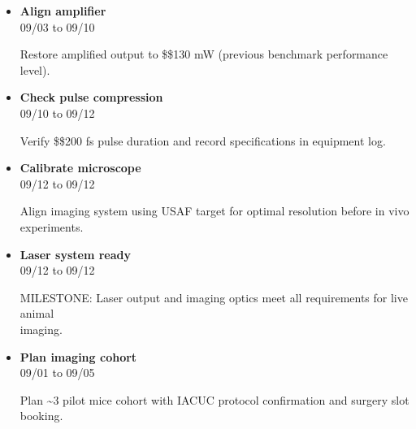 \documentclass[landscape,a4paper]{article}
\begin{document}
\begin{itemize}[leftmargin=1cm, itemsep=0.8em]
    \item \textcolor{researchexp}{\textbf{Align amplifier}}\\[0.2em]
          \textcolor{black!70}{\small 09/03 to 09/10}
\\[0.3em]
          \begin{minipage}[t]{0.85\textwidth}
          \textcolor{black!80}{Restore amplified output to \$\geq\$130 mW (previous benchmark performance level).}
          \end{minipage}

    \item \textcolor{researchexp}{\textbf{Check pulse compression}}\\[0.2em]
          \textcolor{black!70}{\small 09/10 to 09/12}
\\[0.3em]
          \begin{minipage}[t]{0.85\textwidth}
          \textcolor{black!80}{Verify \$\leq\$200 fs pulse duration and record specifications in equipment log.}
          \end{minipage}

    \item \textcolor{researchexp}{\textbf{Calibrate microscope}}\\[0.2em]
          \textcolor{black!70}{\small 09/12 to 09/12}
\\[0.3em]
          \begin{minipage}[t]{0.85\textwidth}
          \textcolor{black!80}{Align imaging system using USAF target for optimal resolution before in vivo\\[0.1em]
          experiments.}
          \end{minipage}

    \item \textcolor{researchexp}{\textbf{Laser system ready}}\\[0.2em]
          \textcolor{black!70}{\small 09/12 to 09/12}
\\[0.3em]
          \begin{minipage}[t]{0.85\textwidth}
          \textcolor{black!80}{MILESTONE: Laser output and imaging optics meet all requirements for live animal\\[0.1em]
          imaging.}
          \end{minipage}

    \item \textcolor{other}{\textbf{Plan imaging cohort}}\\[0.2em]
          \textcolor{black!70}{\small 09/01 to 09/05}
\\[0.3em]
          \begin{minipage}[t]{0.85\textwidth}
          \textcolor{black!80}{Plan \textasciitilde{}3 pilot mice cohort with IACUC protocol confirmation and surgery slot\\[0.1em]
          booking.}
          \end{minipage}


\end{itemize}
\end{document}
